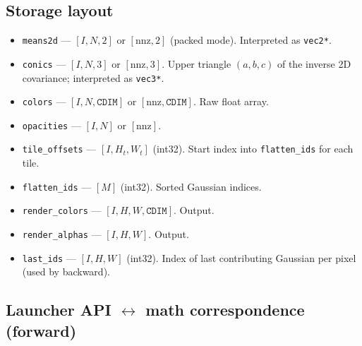 \documentclass[11pt]{article}
\begin{document}
\subsection{Storage layout}

\begin{itemize}
  \item \texttt{means2d} --- $[I, N, 2]$ or $[\text{nnz}, 2]$
  (packed mode). Interpreted as \texttt{vec2*}.
  \item \texttt{conics} --- $[I, N, 3]$ or $[\text{nnz}, 3]$. Upper
  triangle $(a, b, c)$ of the inverse 2D covariance; interpreted as
  \texttt{vec3*}.
  \item \texttt{colors} --- $[I, N, \texttt{CDIM}]$ or
  $[\text{nnz}, \texttt{CDIM}]$. Raw float array.
  \item \texttt{opacities} --- $[I, N]$ or $[\text{nnz}]$.
  \item \texttt{tile\_offsets} --- $[I, H_t, W_t]$ (int32). Start
  index into \texttt{flatten\_ids} for each tile.
  \item \texttt{flatten\_ids} --- $[M]$ (int32). Sorted Gaussian
  indices.
  \item \texttt{render\_colors} --- $[I, H, W, \texttt{CDIM}]$. Output.
  \item \texttt{render\_alphas} --- $[I, H, W]$. Output.
  \item \texttt{last\_ids} --- $[I, H, W]$ (int32). Index of last
  contributing Gaussian per pixel (used by backward).
\end{itemize}

\subsection{Launcher API \texorpdfstring{$\leftrightarrow$}{<->} math correspondence (forward)}
\end{document}
